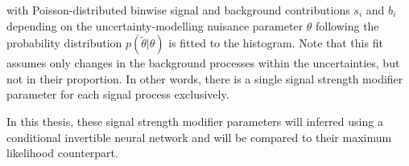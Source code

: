with Poisson-distributed binwise signal and background contributions $s_i$ and $b_i$ depending on the uncertainty-modelling nuisance parameter $\theta$ following the probability distribution $p(\tilde{\theta} | \theta)$ is fitted to the histogram. Note that this fit assumes only changes in the background processes within the uncertainties, but not in their proportion. In other words, there is a single signal strength modifier parameter for each signal process exclusively.

In this thesis, these signal strength modifier parameters will inferred using a conditional invertible neural network and will be compared to their maximum likelihood counterpart.